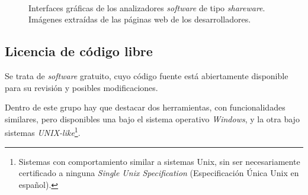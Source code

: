 \begin{figure}[htbp]
    \centering
     \\
    \caption{Interfaces gráficas de los analizadores \emph{software} de tipo \emph{shareware}. Imágenes extraídas de las páginas web de los desarrolladores.} 
    \label{fig:matriz-gui-close-sw}
\end{figure}


\subsection{Licencia de código libre}
Se trata de \emph{software} gratuito, cuyo código fuente está abiertamente disponible para su revisión y posibles modificaciones\cite{gonzalez2003introduccion}.

Dentro de este grupo hay que destacar dos herramientas, con funcionalidades similares, pero disponibles una bajo el sistema operativo \emph{Windows\texttrademark}, y la otra bajo sistemas \emph{UNIX-like}\footnote{Sistemas con comportamiento similar a sistemas Unix, sin ser necesariamente certificado a ninguna \emph{Single Unix Specification} (Especificación Única Unix en español).}.

